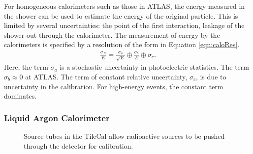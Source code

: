For homogeneous calorimeters such as those in ATLAS, the energy measured in the shower can be used to estimate the energy of the original particle.
This is limited by several uncertainties: the point of the first interaction, leakage of the shower out through the calorimeter.
The measurement of energy by the calorimeters is specified by a resolution of the form in Equation \ref{eqn:caloRes}.
\begin{equation}\begin{split}\label{eqn:caloRes}
    \frac{\sigma_E}{E}=\frac{\sigma_a}{\sqrt{E}}\oplus\frac{\sigma_b}{E}\oplus\sigma_c.
\end{split}\end{equation} 
Here, the term $\sigma_a$ is a stochastic uncertainty in photoelectric statistics.
The term $\sigma_b\approx0$ at ATLAS.
The term of constant relative uncertainty, $\sigma_c$, is due to uncertainty in the calibration.
For high-energy events, the constant term dominates.

\subsubsection{Liquid Argon Calorimeter}

\begin{figure}[h!]
\captionsetup[subfigure]{position=b}
\centering
{}
\caption{Source tubes in the TileCal allow radioactive sources to be pushed through the detector for calibration.}
\label{fig:atlasCalo}
\end{figure}

